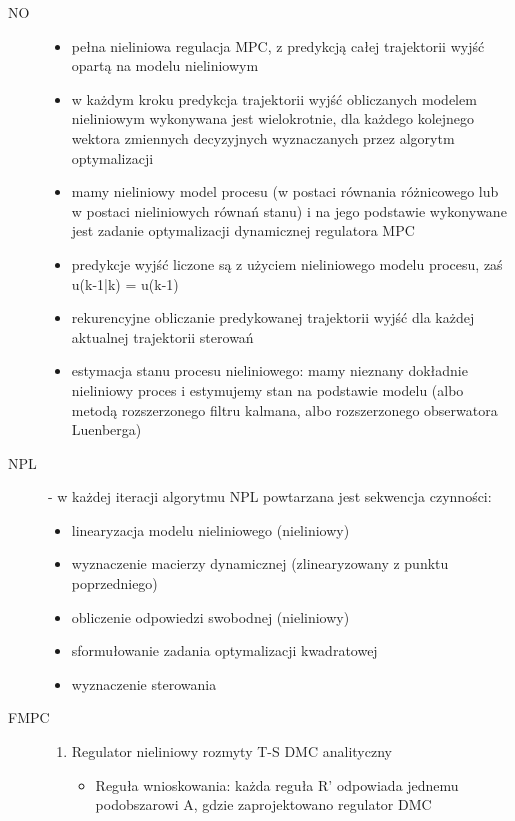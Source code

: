\begin{description}
    \item[NO]\mbox{}
    \begin{itemize}
        \item pełna nieliniowa regulacja MPC, z predykcją całej trajektorii wyjść opartą na modelu nieliniowym
        \item w każdym kroku predykcja trajektorii wyjść obliczanych modelem nieliniowym wykonywana jest wielokrotnie, dla każdego kolejnego wektora zmiennych decyzyjnych wyznaczanych przez algorytm optymalizacji
        \item mamy nieliniowy model procesu (w postaci równania różnicowego lub w postaci nieliniowych równań stanu) i na jego podstawie wykonywane jest zadanie optymalizacji dynamicznej regulatora MPC
        \item predykcje wyjść liczone są z użyciem nieliniowego modelu procesu, zaś u(k-1|k) = u(k-1)
        \item rekurencyjne obliczanie predykowanej trajektorii wyjść dla każdej aktualnej trajektorii sterowań
        \item estymacja stanu procesu nieliniowego: mamy nieznany dokładnie nieliniowy proces i estymujemy stan na podstawie modelu (albo metodą rozszerzonego filtru kalmana, albo rozszerzonego obserwatora Luenberga)
    \end{itemize}
    \item[NPL] - w każdej iteracji algorytmu NPL powtarzana jest sekwencja czynności:\mbox{}
    \begin{itemize}
        \item linearyzacja modelu nieliniowego (nieliniowy)
        \item wyznaczenie macierzy dynamicznej (zlinearyzowany z punktu poprzedniego)
        \item obliczenie odpowiedzi swobodnej (nieliniowy)
        \item sformułowanie zadania optymalizacji kwadratowej
        \item wyznaczenie sterowania
    \end{itemize}
    \item[FMPC]\mbox{}
    \begin{enumerate}
        \item Regulator nieliniowy rozmyty T-S DMC analityczny\mbox{}
        \begin{itemize}
            \item Reguła wnioskowania: każda reguła R' odpowiada jednemu podobszarowi A, gdzie zaprojektowano regulator DMC

\end{itemize}
\end{enumerate}
\end{description}
